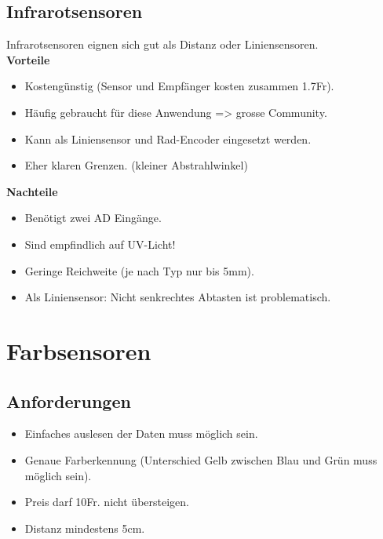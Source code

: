\subsection{Infrarotsensoren}
Infrarotsensoren eignen sich gut als Distanz oder Liniensensoren.\\
\textbf {Vorteile}
\begin{itemize}
\item Kostengünstig (Sensor und Empfänger kosten zusammen 1.7Fr).
\item Häufig gebraucht für diese Anwendung => grosse Community.
\item Kann als Liniensensor und Rad-Encoder eingesetzt werden.
\item Eher klaren Grenzen. (kleiner Abstrahlwinkel)\\
\end{itemize}
\textbf {Nachteile}
\begin{itemize}
\item Benötigt zwei AD Eingänge.
\item Sind empfindlich auf UV-Licht!
\item Geringe Reichweite (je nach Typ nur bis 5mm).
\item Als Liniensensor: Nicht senkrechtes Abtasten ist problematisch.
\end{itemize}


\section{Farbsensoren}
\subsection{Anforderungen}
\begin{itemize}
\item Einfaches auslesen der Daten muss möglich sein.
\item Genaue Farberkennung (Unterschied Gelb zwischen Blau und Grün muss möglich sein).
\item Preis darf 10Fr. nicht übersteigen.
\item Distanz mindestens 5cm.
\end{itemize}

